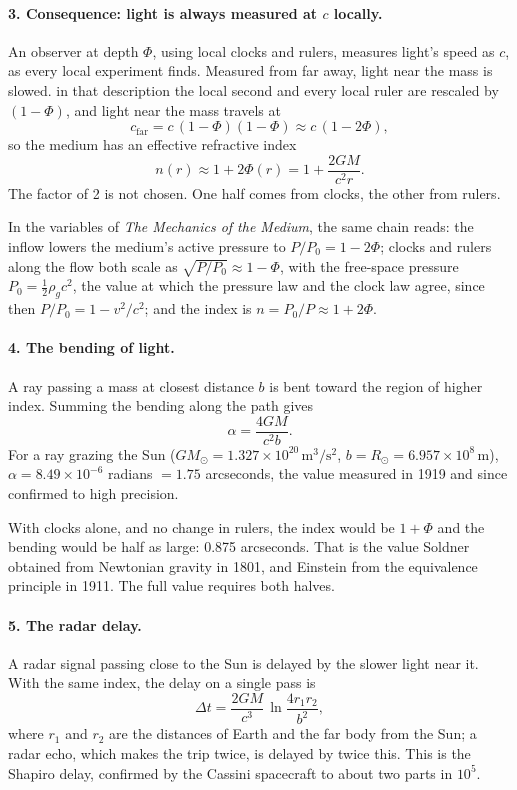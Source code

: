 \documentclass[11pt,a4paper]{article}
\begin{document}
\paragraph{3. Consequence: light is always measured at $c$ locally.} An observer at depth $\Phi$, using local clocks and rulers, measures light's speed as $c$, as every local experiment finds. Measured from far away, light near the mass is slowed.  in that description the local second and every local ruler are rescaled by $(1-\Phi)$, and light near the mass travels at
\[
c_{\text{far}} = c\,(1-\Phi)(1-\Phi) \approx c\,(1-2\Phi),
\]
so the medium has an effective refractive index
\[
n(r) \approx 1 + 2\Phi(r) = 1 + \frac{2GM}{c^2 r}.
\]
The factor of 2 is not chosen. One half comes from clocks, the other from rulers.

In the variables of \emph{The Mechanics of the Medium}, the same chain reads: the inflow lowers the medium's active pressure to $P/P_0 = 1 - 2\Phi$; clocks and rulers along the flow both scale as $\sqrt{P/P_0} \approx 1 - \Phi$, with the free-space pressure $P_0 = \tfrac12\rho_g c^2$, the value at which the pressure law and the clock law agree, since then $P/P_0 = 1 - v^2/c^2$; and the index is $n = P_0/P \approx 1 + 2\Phi$.

\paragraph{4. The bending of light.} A ray passing a mass at closest distance $b$ is bent toward the region of higher index. Summing the bending along the path gives
\[
\alpha = \frac{4GM}{c^2 b}.
\]
For a ray grazing the Sun ($GM_\odot = 1.327\times10^{20}\,\mathrm{m^3/s^2}$, $b = R_\odot = 6.957\times10^{8}$\,m), $\alpha = 8.49\times10^{-6}$ radians $= 1.75$ arcseconds, the value measured in 1919 and since confirmed to high precision.

With clocks alone, and no change in rulers, the index would be $1 + \Phi$ and the bending would be half as large: 0.875 arcseconds. That is the value Soldner obtained from Newtonian gravity in 1801, and Einstein from the equivalence principle in 1911. The full value requires both halves.

\paragraph{5. The radar delay.} A radar signal passing close to the Sun is delayed by the slower light near it. With the same index, the delay on a single pass is
\[
\Delta t = \frac{2GM}{c^3}\,\ln\!\frac{4 r_1 r_2}{b^2},
\]
where $r_1$ and $r_2$ are the distances of Earth and the far body from the Sun; a radar echo, which makes the trip twice, is delayed by twice this. This is the Shapiro delay, confirmed by the Cassini spacecraft to about two parts in $10^{5}$.
\end{document}
